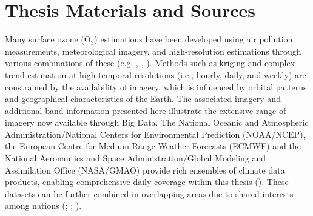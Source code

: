 \chapter{Thesis Materials and Sources}
\label{chap:tmas} Many surface ozone (O$_3$) estimations have been developed using air pollution measurements, meteorological imagery, and high-resolution estimations through various combinations of these (e.g. \cite{alvarez-mendoza_spatial_2019}, \cite{schultz_tropospheric_2017}, \cite{wang_machine_2022}). Methods such as kriging and complex trend estimation at high temporal resolutions (i.e., hourly, daily, and weekly) are constrained by the availability of imagery, which is influenced by orbital patterns and geographical characteristics of the Earth. The associated imagery and additional band information presented here illustrate the extensive range of imagery now available through Big Data. The National Oceanic and Atmospheric Administration/National Centers for Environmental Prediction (NOAA/NCEP), the European Centre for Medium-Range Weather Forecasts (ECMWF) and the National Aeronautics and Space Administration/Global Modeling and Assimilation Office (NASA/GMAO) provide rich ensembles of climate data products, enabling comprehensive daily coverage within this thesis (\cite{schultz_tropospheric_2017}). These datasets can be further combined in overlapping areas due to shared interests among nations (\cite{gaudel_tropospheric_2018}; \cite{carrillo-torres_use_2017}; \cite{xu_effectiveness_2022}). 

